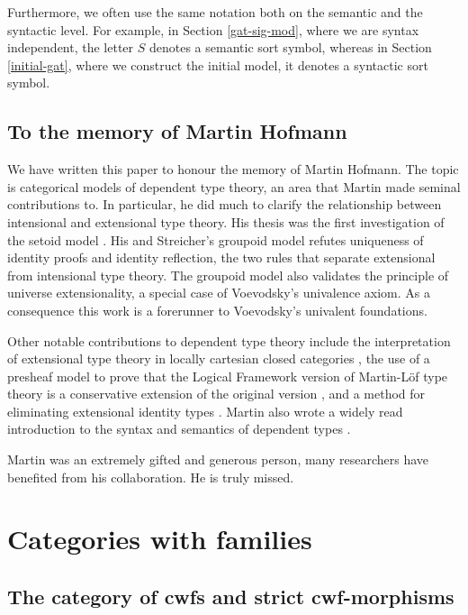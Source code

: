\documentclass{lmcs}
\begin{document}
Furthermore, we often use the same notation both on the semantic and the syntactic level. For example, in Section \ref{gat-sig-mod},  where we are syntax independent, the letter $S$ denotes a semantic sort symbol, whereas in Section \ref{initial-gat}, where we construct the initial model, it denotes a syntactic sort symbol.

\subsection*{To the memory of Martin Hofmann}

We have written this paper to honour the memory of Martin Hofmann. The topic is categorical models of dependent type theory, an area that Martin made seminal contributions to. In particular, he did much to clarify the relationship between intensional and extensional type theory.
His thesis was the first investigation of the setoid model \cite{hofmann:phd}. His and Streicher's groupoid model \cite{hofmann:groupoid} refutes uniqueness of identity proofs and identity reflection, the two rules that separate extensional from intensional type theory. The groupoid model also validates the principle of universe extensionality, a special case of Voevodsky's univalence axiom. As a consequence this work is a forerunner to Voevodsky's univalent foundations.

Other notable contributions to dependent type theory include the interpretation of extensional type theory in locally cartesian closed categories \cite{hofmann:csl,curien-garner-hofmann}, the use of a presheaf model to prove that the Logical Framework version of Martin-Löf type theory is a conservative extension of the original version \cite{hofmann:cambridge}, and a method for eliminating extensional identity types \cite{hofmann:conservativity}. Martin also wrote a widely read introduction to the syntax and semantics of dependent types \cite{hofmann:cambridge}.

Martin was an extremely gifted and generous person,
many researchers have benefited from his collaboration.
He is truly missed.

\section{Categories with families}\label{sec:def_cwf}

\subsection{The category of cwfs and strict cwf-morphisms}
\end{document}
